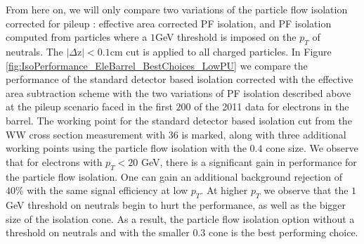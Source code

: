 From here on, we will only compare two variations of the particle flow isolation corrected
for pileup : effective area corrected PF isolation, and PF isolation computed from particles
where a $1$GeV threshold is imposed on the $p_{T}$ of neutrals. The $|\Delta$z$| < 0.1$cm 
cut is applied to all charged particles. In Figure \ref{fig:IsoPerformance_EleBarrel_BestChoices_LowPU}
 we compare the performance of the standard detector based isolation corrected with the effective 
area subtraction scheme with the two variations of PF isolation described above at the pileup 
scenario faced in the first $200$ \ipb of the 2011 data for electrons in the barrel. The working 
point for the standard detector based isolation cut from the WW  cross section measurement with 
$36$ \ipb is marked, along with three additional working points using the particle flow isolation 
with the $0.4$ cone size. We observe that for electrons with $p_{T} < 20$ GeV, there is a 
significant gain in performance for the particle flow isolation. One can gain an additional 
background rejection of $40\%$ with the same signal efficiency at low $p_{T}$. At higher $p_{T}$ 
we observe that the $1$GeV threshold on neutrals begin to hurt the performance, as well as the 
bigger size of the isolation cone. As a result, the particle flow isolation option without
a threshold on neutrals and with the smaller $0.3$ cone is the best performing choice.


